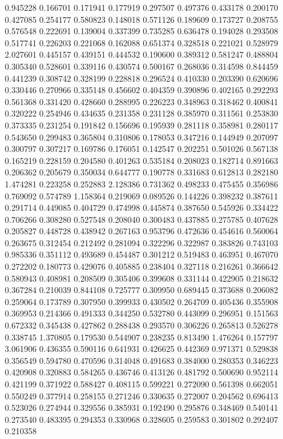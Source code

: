 0.945228
0.166701
0.171941
0.177919
0.297507
0.497376
0.433178
0.200170
0.427085
0.254177
0.580823
0.148018
0.571126
0.189609
0.173727
0.208755
0.576548
0.222691
0.139004
0.337399
0.735285
0.636478
0.194028
0.293508
0.517741
0.226203
0.221068
0.162088
0.651374
0.328518
0.221021
0.528979
2.027601
0.445157
0.439151
0.444532
0.190600
0.389312
0.581247
0.488804
0.305340
0.528601
0.339116
0.430574
0.500167
0.268036
0.314598
0.844459
0.441239
0.308742
0.328199
0.228818
0.296524
0.410330
0.203390
0.620696
0.330446
0.270966
0.335148
0.456602
0.404359
0.390896
0.402165
0.292293
0.561368
0.331420
0.428660
0.288995
0.226223
0.348963
0.318462
0.400841
0.320222
0.254946
0.434635
0.231358
0.231128
0.385970
0.311561
0.253830
0.373335
0.231254
0.191842
0.156696
0.195939
0.281118
0.358981
0.280117
0.543650
0.299483
0.365804
0.310806
0.178053
0.347216
0.144949
0.207097
0.300797
0.307217
0.169786
0.176051
0.142547
0.202251
0.501026
0.567138
0.165219
0.228159
0.204580
0.401263
0.535184
0.208023
0.182714
0.891663
0.206362
0.205679
0.350034
0.644777
0.190778
0.331683
0.612813
0.282180
1.474281
0.223258
0.252883
2.128386
0.731362
0.498233
0.475455
0.356986
0.769092
0.574789
1.158364
0.219069
0.089526
0.144226
0.398232
0.387611
0.291714
0.449085
0.404729
0.474998
0.445874
0.387650
0.545926
0.334422
0.706266
0.308280
0.527548
0.208040
0.300483
0.437885
0.275785
0.407628
0.205827
0.448728
0.438942
0.267163
0.953796
0.472636
0.454616
0.560064
0.263675
0.312454
0.212492
0.281094
0.322296
0.322987
0.383826
0.743103
0.985336
0.351112
0.493689
0.454487
0.301212
0.519483
0.463951
0.467070
0.272202
0.180773
0.429076
0.405885
0.238404
0.327118
0.216261
0.366642
0.580943
0.408981
0.208509
0.305406
0.399608
0.331144
0.422905
0.218632
0.367284
0.210039
0.844108
0.725777
0.309950
0.689445
0.373688
0.206082
0.259064
0.173789
0.307950
0.399933
0.430502
0.264709
0.405436
0.355908
0.369953
0.214366
0.491333
0.344250
0.532780
0.443099
0.296951
0.151563
0.672332
0.345438
0.427862
0.288438
0.293570
0.306226
0.265813
0.526278
0.338745
1.370805
0.179530
0.544907
0.238235
0.813490
1.476264
0.157797
3.061906
0.436355
0.590116
0.641931
0.426625
0.442369
0.971371
0.529838
0.356549
0.594780
0.470596
0.314048
0.491683
0.384000
0.280353
0.346223
0.420908
0.320883
0.584265
0.436746
0.413126
0.481792
0.500690
0.952114
0.421199
0.371922
0.588427
0.408115
0.599221
0.272090
0.561398
0.662051
0.550249
0.377914
0.258155
0.271246
0.330635
0.272007
0.204562
0.696413
0.523026
0.274944
0.329556
0.385931
0.192490
0.295876
0.348469
0.540141
0.273540
0.483395
0.294353
0.330968
0.328605
0.259583
0.301802
0.292407
0.210358

